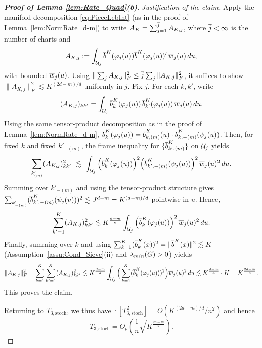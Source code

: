 \documentclass[12pt,american]{article}
\theoremstyle{definition}
\theoremstyle{plain}
\theoremstyle{definition}
\theoremstyle{plain}
\theoremstyle{plain}
\theoremstyle{plain}
\theoremstyle{plain}
\theoremstyle{plain}
\newcommand{\E}{\mathbb{E}}
\begin{document}
\begin{proof}[\textbf{Proof of Lemma \ref{lem:Rate_Quad}(b)}]
\smallskip
\noindent\emph{Justification of the claim.}
Apply the manifold decomposition \eqref{eq:PieceLebInt} (as in the proof of Lemma~\ref{lem:NormRate_d-m}) to write
$A_K=\sum_{j=1}^{\overline{j}}A_{K,j}$,
where $\overline{j}<\infty$ is the number of charts and
\[
A_{K,j}:=\int_{{\cal U}_j}\overline{b}^K(\varphi_j(u))\overline{b}^K(\varphi_j(u))'\,\overline{w}_j(u)\,du,
\]
with bounded $\overline{w}_j(u)$.
Using $\|\sum_{j}A_{K,j}\|_F^2\le \overline{j}\sum_j\|A_{K,j}\|_F^2$, it suffices to show $\|A_{K,j}\|_F^2\lesssim K^{(2d-m)/d}$ uniformly in $j$.
Fix $j$.
For each $k,k'$, write
\[
(A_{K,j})_{kk'}=\int_{{\cal U}_j}\overline{b}_k^K(\varphi_j(u))\,\overline{b}_{k'}^K(\varphi_j(u))\,\overline{w}_j(u)\,du.
\]
Using the same tensor-product decomposition as in the proof of Lemma~\ref{lem:NormRate_d-m},
$\overline{b}_{k}^K(\varphi_j(u))=\overline{b}_{k,(m)}^K(u)\cdot\overline{b}_{k,-(m)}^K(\psi_j(u))$.
Then, for fixed $k$ and fixed $k'_{-(m)}$, the frame inequality for $\{\overline{b}_{k',(m)}^K\}$ on ${\cal U}_j$ yields
\[
\sum_{k'_{(m)}} (A_{K,j})_{kk'}^2
\ \lesssim\ \int_{{\cal U}_j}\Big(\overline{b}_k^K(\varphi_j(u))\Big)^2\Big(\overline{b}_{k',-(m)}^K(\psi_j(u))\Big)^2\,\overline{w}_j(u)^2\,du.
\]
Summing over $k'_{-(m)}$ and using the tensor-product structure gives
$\sum_{k'_{-(m)}}(\overline{b}_{k',-(m)}^K(\psi_j(u)))^2\lesssim J^{d-m}=K^{(d-m)/d}$ pointwise in $u$.
Hence,
\[
\sum_{k'=1}^{K}(A_{K,j})_{kk'}^2\lesssim K^{\frac{d-m}{d}}\int_{{\cal U}_j}\Big(\overline{b}_k^K(\varphi_j(u))\Big)^2\,\overline{w}_j(u)^2\,du.
\]
Finally, summing over $k$ and using $\sum_{k=1}^{K}(\overline{b}_k^K(x))^2=\|\overline{b}^K(x)\|^2\lesssim K$ (Assumption~\ref{assu:Cond_Sieve}(ii) and $\lambda_{min}(G)>0$) yields
\[
\|A_{K,j}\|_F^2
=\sum_{k=1}^K\sum_{k'=1}^K (A_{K,j})_{kk'}^2
\lesssim K^{\frac{d-m}{d}}\int_{{\cal U}_j}\Big(\sum_{k=1}^{K}(\overline{b}_k^K(\varphi_j(u)))^2\Big)\overline{w}_j(u)^2\,du
\lesssim K^{\frac{d-m}{d}}\cdot K=K^{\frac{2d-m}{d}}.
\]
This proves the claim.

\smallskip
\noindent Returning to $T_{3,\mathrm{stoch}}$, we thus have
$\E[T_{3,\mathrm{stoch}}^2]=O(K^{(2d-m)/d}/n^2)$ and hence
\[
T_{3,\mathrm{stoch}}=O_p\!\left(\frac1n\sqrt{K^{\frac{2d-m}{d}}}\right).
\]


\end{proof}
\end{document}
